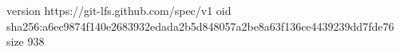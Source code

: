 version https://git-lfs.github.com/spec/v1
oid sha256:a6ec9874f140e2683932edada2b5d848057a2be8a63f136ce4439239dd7fde76
size 938
